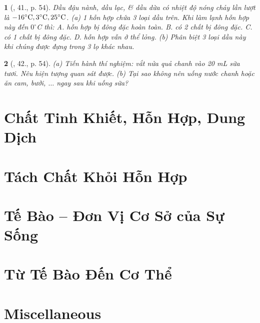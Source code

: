 \documentclass{article}
\newtheorem{baitoan}{}
\begin{document}
\begin{baitoan}[\cite{ncpt_KHTN_6_tap_1}, 41., p. 54]
	Dầu đậu nành, dầu lạc, \& dầu dừa có nhiệt độ nóng chảy lần lượt là $\rm-16^\circ C,3^\circ C,25^\circ C$. (a) 1 hỗn hợp chứa 3 loại dầu trên. Khi làm lạnh hỗn hợp này đến $0^\circ${\rm C} thì: {\sf A.} hỗn hợp bị đông đặc hoàn toàn. {\sf B.} có 2 chất bị đông đặc. {\sf C.} có 1 chất bị đông đặc. {\sf D.} hỗn hợp vẫn ở thể lỏng. (b) Phân biệt 3 loại dầu này khi chúng được đựng trong 3 lọ khác nhau.
\end{baitoan}

\begin{baitoan}[\cite{ncpt_KHTN_6_tap_1}, 42., p. 54]
	(a) Tiến hành thí nghiệm: vắt nửa quả chanh vào {\rm20 mL} sữa tươi. Nêu hiện tượng quan sát được. (b) Tại sao không nên uống nước chanh hoặc ăn cam, bưởi, $\ldots$ ngay sau khi uống sữa?
\end{baitoan}


\section{Chất Tinh Khiết, Hỗn Hợp, Dung Dịch}


\section{Tách Chất Khỏi Hỗn Hợp}


\section{Tế Bào -- Đơn Vị Cơ Sở của Sự Sống}


\section{Từ Tế Bào Đến Cơ Thể}


\section{Miscellaneous}


\printbibliography[heading=bibintoc]
	
\end{document}
